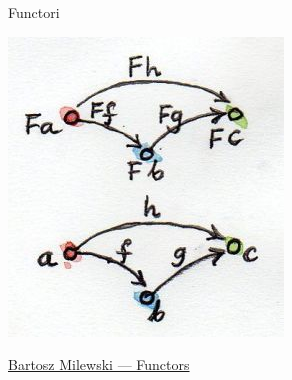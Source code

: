 \documentclass[xcolor=pdftex,romanian,colorlinks]{beamer}
\begin{document}
\begin{frame}{Functori}{}
\begin{minipage}{.24\columnwidth}
\end{minipage}
\begin{minipage}{.24\columnwidth}
\includegraphics[scale=.5]{functorcompos}
\end{minipage}
\begin{minipage}{.24\columnwidth}
\href{https://bartoszmilewski.com/2015/01/20/functors/}{Bartosz Milewski --- Functors}
\end{minipage}


\end{frame}
\end{document}
